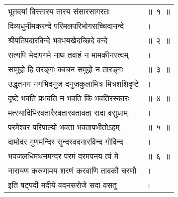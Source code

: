 {\begin{longtable}[l]{@{\hspace*{\mylen}}>{\setlength\parfillskip{0pt}}p{\mylenone}@{}@{}l@{}}
भूतदयां विस्तारय तारय संसारसागरतः & ॥~१~॥\\
दिव्यधुनीमकरन्दे परिमलपरिभोगसच्चिदानन्दे & ।\\ \nopagebreak
श्रीपतिपदारविन्दे भवभयखेदच्छिदे वन्दे & ॥~२~॥\\
सत्यपि भेदापगमे नाथ तवाहं न मामकीनस्त्वम् & ।\\ \nopagebreak
सामुद्रो हि तरङ्गः क्वचन समुद्रो न तारङ्गः & ॥~३~॥\\
उद्धृतनग नगभिदनुज दनुजकुलामित्र मित्रशशिदृष्टे & ।\\ \nopagebreak
दृष्टे भवति प्रभवति न भवति किं भवतिरस्कारः & ॥~४~॥\\
मत्स्यादिभिरवतारैरवतारवतावता सदा वसुधाम् & ।\\ \nopagebreak
परमेश्वर परिपाल्यो भवता भवतापभीतोऽहम् & ॥~५~॥\\
दामोदर गुणमन्दिर सुन्दरवदनारविन्द गोविन्द & ।\\ \nopagebreak
भवजलधिमथनमन्दर परमं दरमपनय त्वं मे & ॥~६~॥\\
नारायण करुणामय शरणं करवाणि तावकौ चरणौ & ।\\ \nopagebreak
इति षट्पदी मदीये वदनसरोजे सदा वसतु & ॥
\end{longtable}
}

